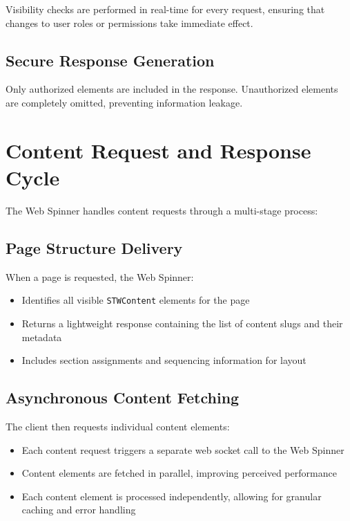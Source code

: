 Visibility checks are performed in real-time for every request, ensuring that changes to user roles or permissions take immediate effect.

\subsection{Secure Response Generation}

Only authorized elements are included in the response. Unauthorized elements are completely omitted, preventing information leakage.

\section{Content Request and Response Cycle}
\label{sec:content-cycle}

The Web Spinner handles content requests through a multi-stage process:

\subsection{Page Structure Delivery}

When a page is requested, the Web Spinner:
\begin{itemize}
    \item Identifies all visible \texttt{STWContent} elements for the page
    \item Returns a lightweight response containing the list of content slugs and their metadata
    \item Includes section assignments and sequencing information for layout
\end{itemize}

\subsection{Asynchronous Content Fetching}

The client then requests individual content elements:
\begin{itemize}
    \item Each content request triggers a separate web socket call to the Web Spinner
    \item Content elements are fetched in parallel, improving perceived performance
    \item Each content element is processed independently, allowing for granular caching and error handling
\end{itemize}

